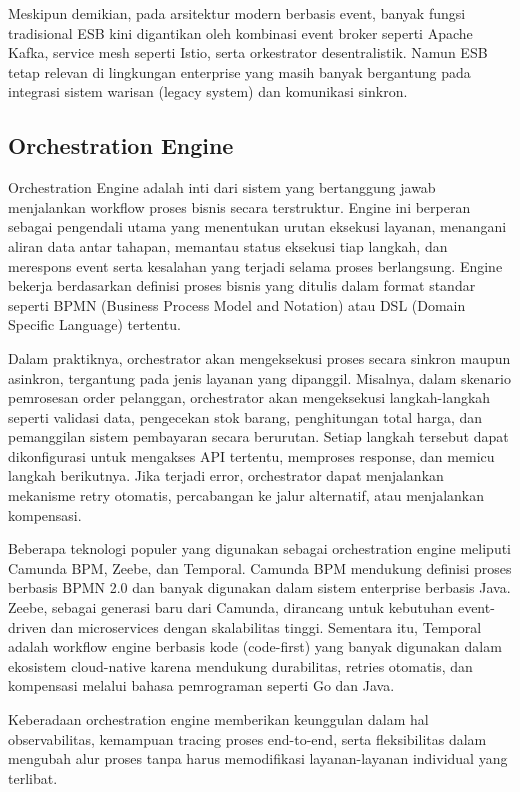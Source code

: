 Meskipun demikian, pada arsitektur modern berbasis event, banyak fungsi tradisional ESB kini digantikan oleh kombinasi event broker seperti Apache Kafka, service mesh seperti Istio, serta orkestrator desentralistik. Namun ESB tetap relevan di lingkungan enterprise yang masih banyak bergantung pada integrasi sistem warisan (legacy system) dan komunikasi sinkron.


\subsection{Orchestration Engine}
 Orchestration Engine adalah inti dari sistem yang bertanggung jawab menjalankan workflow proses bisnis secara terstruktur. Engine ini berperan sebagai pengendali utama yang menentukan urutan eksekusi layanan, menangani aliran data antar tahapan, memantau status eksekusi tiap langkah, dan merespons event serta kesalahan yang terjadi selama proses berlangsung. Engine bekerja berdasarkan definisi proses bisnis yang ditulis dalam format standar seperti BPMN (Business Process Model and Notation) atau DSL (Domain Specific Language) tertentu.

Dalam praktiknya, orchestrator akan mengeksekusi proses secara sinkron maupun asinkron, tergantung pada jenis layanan yang dipanggil. Misalnya, dalam skenario pemrosesan order pelanggan, orchestrator akan mengeksekusi langkah-langkah seperti validasi data, pengecekan stok barang, penghitungan total harga, dan pemanggilan sistem pembayaran secara berurutan. Setiap langkah tersebut dapat dikonfigurasi untuk mengakses API tertentu, memproses response, dan memicu langkah berikutnya. Jika terjadi error, orchestrator dapat menjalankan mekanisme retry otomatis, percabangan ke jalur alternatif, atau menjalankan kompensasi.

Beberapa teknologi populer yang digunakan sebagai orchestration engine meliputi Camunda BPM, Zeebe, dan Temporal. Camunda BPM mendukung definisi proses berbasis BPMN 2.0 dan banyak digunakan dalam sistem enterprise berbasis Java. Zeebe, sebagai generasi baru dari Camunda, dirancang untuk kebutuhan event-driven dan microservices dengan skalabilitas tinggi. Sementara itu, Temporal adalah workflow engine berbasis kode (code-first) yang banyak digunakan dalam ekosistem cloud-native karena mendukung durabilitas, retries otomatis, dan kompensasi melalui bahasa pemrograman seperti Go dan Java.

Keberadaan orchestration engine memberikan keunggulan dalam hal observabilitas, kemampuan tracing proses end-to-end, serta fleksibilitas dalam mengubah alur proses tanpa harus memodifikasi layanan-layanan individual yang terlibat.

